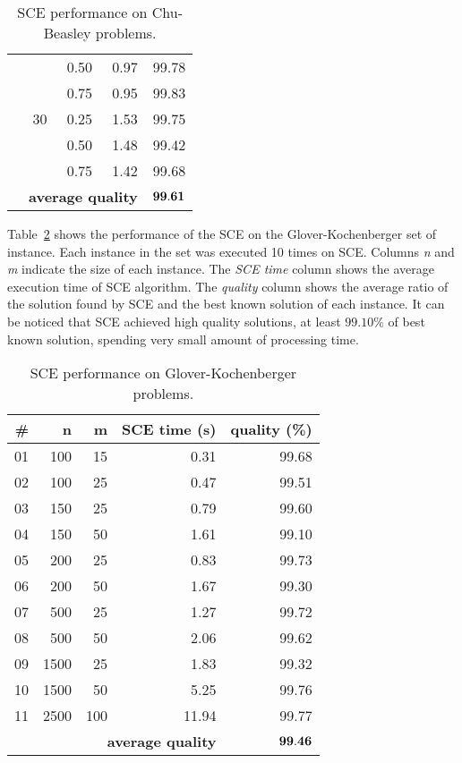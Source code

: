 \begin{table}
{\begin{center}
\begin{tabular}{|r|r|r|rr|}
    &    & 0.50 & 0.97 & 99.78 \\
    &    & 0.75 & 0.95 & 99.83 \\ \cline{2-5}
    & 30 & 0.25 & 1.53 & 99.75 \\
    &    & 0.50 & 1.48 & 99.42 \\
    &    & 0.75 & 1.42 & 99.68 \\ \cline{2-5}
    & \multicolumn{3}{r}{\textbf{average quality}}  & $\bf 99.61$  \\ \hline
\end{tabular}
\end{center}
}
 \caption{SCE performance on Chu-Beasley problems.}
 \label{tab:chu}
\end{table}

Table~\ref{tab:gk} shows the performance of the SCE on the Glover-Kochenberger set of instance.
Each instance in the set was executed 10 times on SCE.
Columns \textit{n} and \textit{m} indicate the size of each instance.
The \textit{SCE time} column shows the average execution time of SCE algorithm.
The \textit{quality} column shows the average ratio of the solution found by SCE and
the best known solution of each instance.
It can be noticed that SCE achieved high quality solutions, at least $99.10\%$
of best known solution, spending very small amount of processing time.

\begin{table}
{
\renewcommand{\arraystretch}{1.5}%
\fontsize{8.5pt}{1em}\selectfont 
\begin{center}
\begin{tabular}{|r|r|r|r|r|} \hline
		\textbf{\#} & \textbf{n}   & \textbf{m}  & \textbf{SCE time (s)} & \textbf{quality (\%)} \\ \hline
01 & 100 & 15 & 0.31 & 99.68 \\ \hline
02 & 100 & 25 & 0.47 & 99.51 \\ \hline
03 & 150 & 25 & 0.79 & 99.60 \\ \hline
04 & 150 & 50 & 1.61 & 99.10 \\ \hline
05 & 200 & 25 & 0.83 & 99.73 \\ \hline
06 & 200 & 50 & 1.67 & 99.30 \\ \hline
07 & 500 & 25 & 1.27 & 99.72 \\ \hline
08 & 500 & 50 & 2.06 & 99.62 \\ \hline
09 &1500 & 25 & 1.83 & 99.32 \\ \hline
10 &1500 & 50 & 5.25 & 99.76 \\ \hline
11 &2500 &100 &11.94 & 99.77 \\ \cline{1-5}
    \multicolumn{4}{|r|}{\textbf{average quality}}  & $\bf 99.46$  \\ \hline
\end{tabular}
\end{center}
}
 \caption{SCE performance on Glover-Kochenberger problems.}
 \label{tab:gk}
\end{table}

